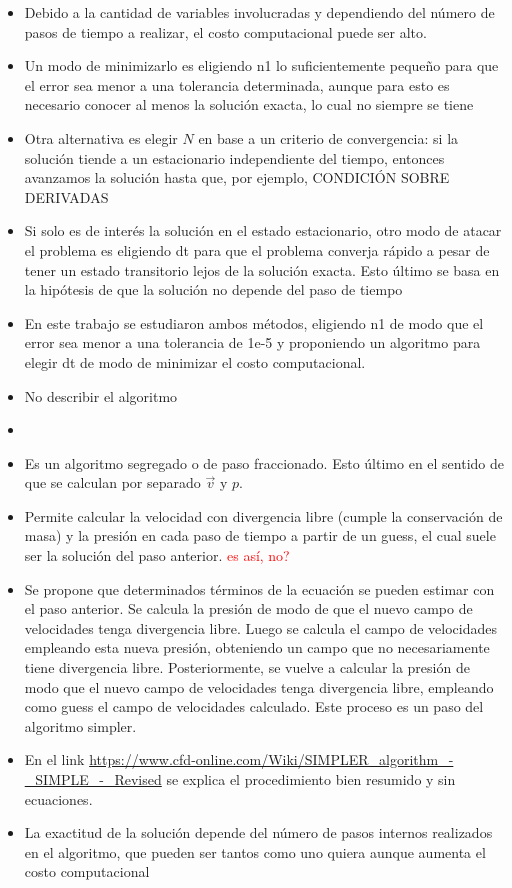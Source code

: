 \documentclass[aps,prb,twocolumn,superscriptaddress,floatfix,longbibliography,10pt]{revtex4-2}
\newif\ifptitle
\newif\ifpnumber
\newcounter{para}
\newcommand\ptitle[1]{\par\refstepcounter{para}
{\ifpnumber{\noindent\textcolor{lightgray}{\textbf{\thepara}}\indent}\fi}
{\ifptitle{\textbf{[{#1}]}}\fi}}
\begin{document}
\ptitle{Costo computacional y elección de dt}
\begin{itemize}
  \item Debido a la cantidad de variables involucradas y dependiendo del número de pasos de tiempo a realizar, el costo computacional puede ser alto.
  \item Un modo de minimizarlo es eligiendo n1 lo suficientemente pequeño para que el error sea menor a una tolerancia determinada, aunque para esto es necesario conocer al menos la solución exacta, lo cual no siempre se tiene
  \item Otra alternativa es elegir $N$ en base a un criterio de convergencia: si la solución tiende a un estacionario independiente del tiempo, entonces avanzamos la solución hasta que, por ejemplo, CONDICIÓN SOBRE DERIVADAS
  \item Si solo es de interés la solución en el estado estacionario, otro modo de atacar el problema es eligiendo dt para que el problema converja rápido a pesar de tener un estado transitorio lejos de la solución exacta. Esto último se basa en la hipótesis de que la solución no depende del paso de tiempo
  \item En este trabajo se estudiaron ambos métodos, eligiendo n1 de modo que el error sea menor a una tolerancia de 1e-5 y proponiendo un algoritmo para elegir dt de modo de minimizar el costo computacional.
  \item No describir el algoritmo
\end{itemize}




\ptitle{Algoritmo simpler simplificadamente}
\begin{itemize}
  \item \cite{Patankar}
  \item Es un algoritmo segregado o de paso fraccionado. Esto último en el sentido de que se calculan por separado $\vec{v}$ y $p$.
  \item Permite calcular la velocidad con divergencia libre (cumple la conservación de masa) y la presión en cada paso de tiempo a partir de un guess, el cual suele ser la solución del paso anterior. \textcolor{red}{es así, no?}
  \item Se propone que determinados términos de la ecuación se pueden estimar con el paso anterior. Se calcula la presión de modo de que el nuevo campo de velocidades tenga divergencia libre. Luego se calcula el campo de velocidades empleando esta nueva presión, obteniendo un campo que no necesariamente tiene divergencia libre. Posteriormente, se vuelve a calcular la presión de modo que el nuevo campo de velocidades tenga divergencia libre, empleando como guess el campo de velocidades calculado. Este proceso es un paso del algoritmo simpler.
  \item En el link \url{https://www.cfd-online.com/Wiki/SIMPLER_algorithm_-_SIMPLE_-_Revised} se explica el procedimiento bien resumido y sin ecuaciones.
  \item La exactitud de la solución depende del número de pasos internos realizados en el algoritmo, que pueden ser tantos como uno quiera aunque aumenta el costo computacional
\end{itemize}
\end{document}
